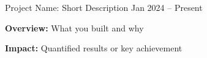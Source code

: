 

\begin{cventries}

  \cvproject
    {Project Name: Short Description}
    {Jan 2024 -- Present}
    {
      \begin{cvitems}
        \item {\textbf{Overview:} What you built and why}
        \item {\textbf{Impact:} Quantified results or key achievement}
      \end{cvitems}
    }

\end{cventries}
